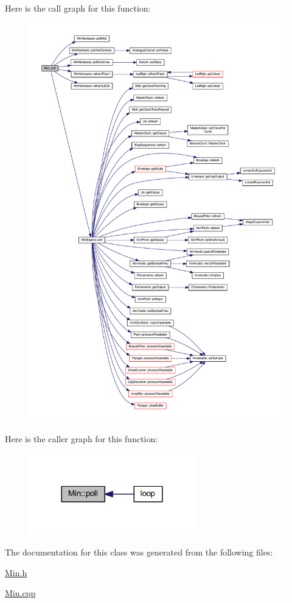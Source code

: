 Here is the call graph for this function\+:
\nopagebreak
\begin{figure}[H]
\begin{center}
\leavevmode
\includegraphics[width=350pt]{dd/d34/class_min_a4ed53c28c8c59dba741daf945dbc160b_cgraph}
\end{center}
\end{figure}
Here is the caller graph for this function\+:
\nopagebreak
\begin{figure}[H]
\begin{center}
\leavevmode
\includegraphics[width=204pt]{dd/d34/class_min_a4ed53c28c8c59dba741daf945dbc160b_icgraph}
\end{center}
\end{figure}


The documentation for this class was generated from the following files\+:\begin{DoxyCompactItemize}
\item 
\hyperlink{_min_8h}{Min.\+h}\item 
\hyperlink{_min_8cpp}{Min.\+cpp}\end{DoxyCompactItemize}
